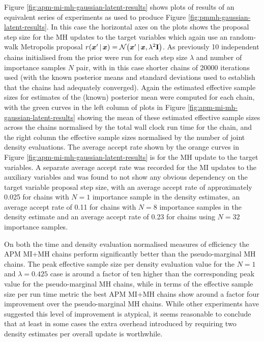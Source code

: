 Figure \ref{fig:apm-mi-mh-gaussian-latent-results} shows plots of results of an equivalent series of experiments as used to produce Figure \ref{fig:pmmh-gaussian-latent-results}. In this case the horizontal axes on the plots shows the proposal step size for the \ac{MH} updates to the target variables which again use an random-walk Metropolis proposal $r(\vct{x}'\gvn\vct{x}) = \nrm{\vct{x}'\gvn\vct{x},\lambda^2\mathbf{I}}$. As previously 10 independent chains initialised from the prior were run for each step size $\lambda$ and number of importance samples $N$ pair, with in this case shorter chains of 20000 iterations used (with the known posterior means and standard deviations used to establish that the chains had adequately converged). Again the estimated effective sample sizes for estimates of the (known) posterior mean were computed for each chain, with the green curves in the left column of plots in Figure \ref{fig:apm-mi-mh-gaussian-latent-results} showing the mean of these estimated effective sample sizes across the chains normalised by the total wall clock run time for the chain, and the right column the effective sample sizes normalised by the number of joint density evaluations. The average accept rate shown by the orange curves in Figure \ref{fig:apm-mi-mh-gaussian-latent-results} is for the \ac{MH} update to the target variables. A separate average accept rate was recorded for the \ac{MI} updates to the auxiliary variables and was found to not show any obvious dependency on the target variable proposal step size, with an average accept rate of approximately 0.025 for chains with $N=1$ importance sample in the density estimates, an average accept rate of 0.11 for chains with $N=8$ importance samples in the density estimate and an average accept rate of 0.23 for chains using $N=32$ importance samples. %

On both the time and density evaluation normalised measures of efficiency the \ac{APM} \ac{MI}+\ac{MH} chains perform significantly better than the pseudo-marginal \ac{MH} chains. The peak effective sample size per density evaluation value for the $N=1$ and $\lambda=0.425$ case is around a factor of ten higher than the corresponding peak value for the pseudo-marginal \ac{MH} chains, while in terms of the effective sample size per run time metric the best \ac{APM} \ac{MI}+\ac{MH} chains show around a factor four improvement over the pseudo-marginal \ac{MH} chains. While other experiments have suggested this level of improvement is atypical, it seems reasonable to conclude that at least in some cases the extra overhead introduced by requiring two density estimates per overall update is worthwhile.

